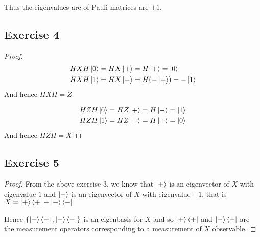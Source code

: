 \documentclass{article}
\begin{document}
Thus the eigenvalues are of Pauli matrices are $\pm 1$.

\subsection*{Exercise 4}
\begin{proof}
\begin{align*}
  HXH \ket{0} &= HX \ket{+} = H \ket{+} = \ket{0}  \\
  HXH \ket{1} &= HX \ket{-} = H (-\ket{-}) = -\ket{1}
\end{align*}
And hence $HXH = Z$

\begin{align*}
  HZH \ket{0} &= HZ \ket{+} = H \ket{-} = \ket{1} \\  
  HZH \ket{1} &= HZ \ket{-} = H \ket{+} = \ket{0}
\end{align*}
And hence $HZH = X$
\end{proof}


\subsection*{Exercise 5}
\begin{proof}
From the above exercise $3$, we know that $\ket{+}$ is an eigenvector of $X$ with eigenvalue $1$ and $\ket{-}$ is an eigenvector of $X$ with eigenvalue $-1$, that is $X = \ket{+}\bra{+} - \ket{-}\bra{-}$

Hence $\{\ket+ \bra+, \ket- \bra-\}$ is an eigenbasis for $X$ and so $\ket+ \bra+$ and $\ket- \bra-$ are the measurement operators corresponding to a measurement of $X$ observable.
\end{proof}
\end{document}
